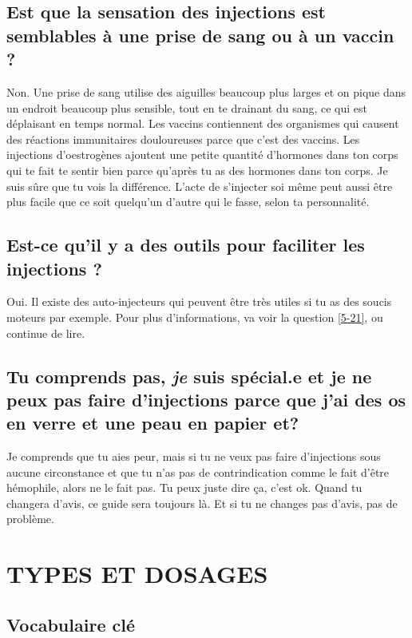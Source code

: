 \documentclass{article}
\begin{document}
\subsection{Est que la sensation des injections est semblables à une prise de sang ou à un vaccin ?}

Non. Une prise de sang utilise des aiguilles beaucoup plus larges et on pique dans un endroit beaucoup plus sensible, tout en te drainant du sang, ce qui est déplaisant en temps normal. Les vaccins contiennent des organismes qui causent des réactions immunitaires douloureuses parce que c'est des vaccins. Les injections d'oestrogènes ajoutent une petite quantité d'hormones dans ton corps qui te fait te sentir bien parce qu'après tu as des hormones dans ton corps. Je suis sûre que tu vois la différence. L'acte de s'injecter soi même peut aussi être plus facile que ce soit quelqu'un d'autre qui le fasse, selon ta personnalité.

\subsection{Est-ce qu'il y a des outils pour faciliter les injections ?}

Oui. Il existe des auto-injecteurs qui peuvent être très utiles si tu as des soucis moteurs par exemple. Pour plus d'informations, va voir la question \ref{5-21}, ou continue de lire.

\subsection{Tu comprends pas, \textit{je} suis spécial.e et je ne peux pas faire d'injections parce que j'ai des os en verre et une peau en papier et\textemdash{}?}

Je comprends que tu aies peur, mais si tu ne veux pas faire d'injections sous aucune circonstance et que tu n'as pas de contrindication comme le fait d'être hémophile, alors ne le fait pas. Tu peux juste dire ça, c'est ok. Quand tu changera d'avis, ce guide sera toujours là. Et si tu ne changes pas d'avis, pas de problème.
 

\section{TYPES ET DOSAGES}\label{td}

\subsection*{Vocabulaire clé}
\end{document}
